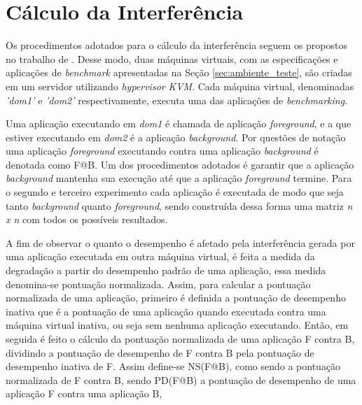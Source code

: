 \documentclass[[10pt,journal]{IEEEtran}
\begin{document}

\section{Cálculo da Interferência}
Os procedimentos adotados para o cálculo da interferência seguem os propostos no trabalho de \cite{koh2007}. Desse modo, duas máquinas virtuais, com as especificações e aplicações de \textit{benchmark} apresentadas na Seção \ref{sec:ambiente_teste}, são criadas em um servidor utilizando \textit{hypervisor} \textit{KVM}. Cada máquina virtual, denominadas \textit{'dom1'} e \textit{'dom2'} respectivamente, executa uma das aplicações de \textit{benchmarking}. 

Uma aplicação executando em \textit{dom1} é chamada de aplicação \textit{foreground}, e a que estiver executando em \textit{dom2} é a aplicação \textit{background}. Por questões de notação uma aplicação \textit{foreground} executando contra uma aplicação \textit{background} é denotada como F@B. Um dos procedimentos adotados é garantir que a aplicação \textit{background} mantenha sua execução até que a aplicação \textit{foreground} termine. Para o segundo e terceiro experimento cada aplicação é executada de modo que seja tanto \textit{background} quanto \textit{foreground}, sendo construída dessa forma uma matriz \textit{n x n} com todos os possíveis resultados. %

A fim de observar o quanto o desempenho é afetado pela interferência gerada por uma aplicação executada em outra máquina virtual, é feita a medida da degradação a partir do desempenho padrão de uma aplicação, essa medida denomina-se pontuação normalizada. Assim, para calcular a pontuação normalizada de uma aplicação, primeiro é definida a pontuação de desempenho inativa que é a pontuação de uma aplicação quando executada contra uma máquina virtual inativa, ou seja sem nenhuma aplicação executando. Então, em seguida é feito o cálculo da pontuação normalizada de uma aplicação F contra B, dividindo a pontuação de desempenho de F contra B pela pontuação de desempenho inativa de F. Assim define-se NS(F@B), como sendo a pontuação normalizada de F contra B, sendo PD(F@B) a pontuação de desempenho de uma aplicação F contra uma aplicação B,
\end{document}
